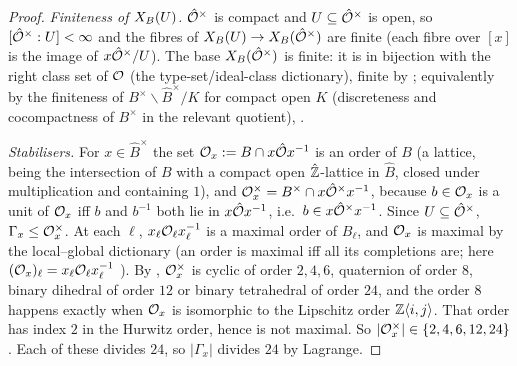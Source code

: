 \begin{proof}
\emph{Finiteness of $X_B(U)$.} $\hat{\mathcal{O}}^\times$ is compact and $U\subseteq\hat{\mathcal{O}}^\times$ is open, so $[\hat{\mathcal{O}}^\times:U]<\infty$ and the fibres of
$X_B(U)\to X_B(\hat{\mathcal{O}}^\times)$ are finite (each fibre over $[x]$ is the image of $x\hat{\mathcal{O}}^\times/U$). The base $X_B(\hat{\mathcal{O}}^\times)$ is finite: it is
in bijection with the right class set of $\mathcal{O}$ (the type-set/ideal-class dictionary), finite by
; equivalently by the finiteness of $B^\times\backslash\hat B^\times/K$ for compact open $K$ (discreteness and cocompactness of $B^\times$ in the
relevant quotient), .

\emph{Stabilisers.} For $x\in\hat B^\times$ the set $\mathcal{O}_x:=B\cap x\hat{\mathcal{O}} x^{-1}$ is an order of $B$ (a lattice, being the intersection of
$B$ with a compact open $\hat{\mathbb{Z}}$-lattice in $\hat B$, closed under multiplication and containing $1$), and $\mathcal{O}_x^\times=B^\times\cap x\hat{\mathcal{O}}^\times x^{-1}$, because
$b\in\mathcal{O}_x$ is a unit of $\mathcal{O}_x$ iff $b$ and $b^{-1}$ both lie in $x\hat{\mathcal{O}} x^{-1}$, i.e.\ $b\in x\hat{\mathcal{O}}^\times x^{-1}$. Since
$U\subseteq\hat{\mathcal{O}}^\times$, $\Gamma_x\le\mathcal{O}_x^\times$. At each $\ell$, $x_\ell\mathcal{O}_\ell x_\ell^{-1}$ is a maximal order of $B_\ell$, and $\mathcal{O}_x$ is
maximal by the local--global dictionary (an order is maximal iff all its completions are; here $(\mathcal{O}_x)_\ell=x_\ell\mathcal{O}_\ell x_\ell^{-1}$
). By
, $\mathcal{O}_x^\times$ is cyclic of order $2,4,6$, quaternion of order $8$, binary dihedral of
order $12$ or binary tetrahedral of order $24$, and the order $8$ happens exactly when $\mathcal{O}_x$ is isomorphic to the Lipschitz order
$\mathbb{Z}\langle i,j\rangle$. That order has index $2$ in the Hurwitz order, hence is not maximal. So $|\mathcal{O}_x^\times|\in\{2,4,6,12,24\}$. Each of
these divides $24$, so $|\Gamma_x|$ divides $24$ by Lagrange.
\end{proof}

